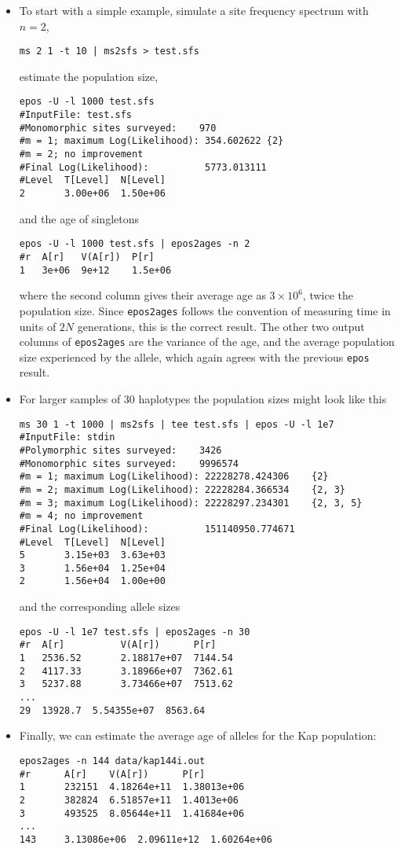 \documentclass[a4paper, english]{article}
\newcommand{\ty}{\texttt}
\begin{document}
\begin{itemize}
  \item To start with a simple example, simulate a site frequency spectrum with $n=2$,
\begin{verbatim}
ms 2 1 -t 10 | ms2sfs > test.sfs
\end{verbatim}
estimate the population size,
\begin{verbatim}
epos -U -l 1000 test.sfs
#InputFile:	test.sfs
#Monomorphic sites surveyed:	970
#m = 1; maximum Log(Likelihood): 354.602622	{2}
#m = 2; no improvement
#Final Log(Likelihood):          5773.013111
#Level  T[Level]  N[Level]
2       3.00e+06  1.50e+06
\end{verbatim}
and the age of singletons
\begin{verbatim}
epos -U -l 1000 test.sfs | epos2ages -n 2
#r  A[r]   V(A[r])  P[r]
1   3e+06  9e+12    1.5e+06
\end{verbatim}
where the second column gives their average age as $3\times 10^6$,
twice the population size. Since \ty{epos2ages} follows the convention
of measuring time in units of $2N$ generations, this is the correct
result. The other two output columns of \ty{epos2ages} are the
variance of the age, and the average population size experienced by
the allele, which again agrees with the previous \ty{epos} result.
\item For larger samples of 30 haplotypes the population sizes might look like this
\begin{verbatim}
ms 30 1 -t 1000 | ms2sfs | tee test.sfs | epos -U -l 1e7
#InputFile:	stdin
#Polymorphic sites surveyed:	3426
#Monomorphic sites surveyed:	9996574
#m = 1; maximum Log(Likelihood): 22228278.424306	{2}
#m = 2; maximum Log(Likelihood): 22228284.366534	{2, 3}
#m = 3; maximum Log(Likelihood): 22228297.234301	{2, 3, 5}
#m = 4; no improvement
#Final Log(Likelihood):          151140950.774671
#Level  T[Level]  N[Level]
5       3.15e+03  3.63e+03
3       1.56e+04  1.25e+04
2       1.56e+04  1.00e+00
\end{verbatim}
and the corresponding allele sizes
\begin{verbatim}
epos -U -l 1e7 test.sfs | epos2ages -n 30
#r  A[r]          V(A[r])      P[r]
1   2536.52       2.18817e+07  7144.54
2   4117.33       3.18966e+07  7362.61
3   5237.88       3.73466e+07  7513.62
...
29  13928.7  5.54355e+07  8563.64
\end{verbatim}
\item Finally, we can estimate the average age of alleles for the Kap
  population:
\begin{verbatim}
epos2ages -n 144 data/kap144i.out
#r      A[r]    V(A[r])      P[r]
1       232151  4.18264e+11  1.38013e+06
2       382824  6.51857e+11  1.4013e+06
3       493525  8.05644e+11  1.41684e+06
...
143     3.13086e+06  2.09611e+12  1.60264e+06
\end{verbatim}  
\end{itemize}
\end{document}
